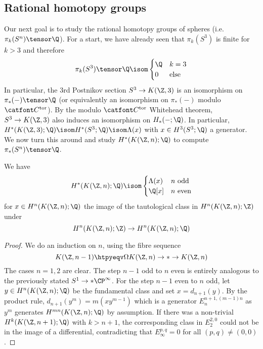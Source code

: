 \subsection{Rational homotopy groups}
Our next goal is to study the rational homotopy groups of spheres (i.e. $\pi_k(S^n) \tensor \Q$).
For a start, we have already seen that $\pi_k(S^3)$ is finite for $k > 3$ and therefore
\begin{equation*}\index{rational homotopy groups!of $S^3$}
	\pi_k(S^3) \tensor \Q \isom \begin{cases}
		\Q 	& k = 3 \\
		0 	& \text{else}
	\end{cases}
\end{equation*}
In particular, the 3rd Postnikov section $S^3 \to K(\Z, 3)$ is an isomorphism on $\pi_*({{-}}) \tensor \Q$ (or equivalently an isomorphism on $\pi_*({{-}})$ modulo $\Ctor$).
By the modulo $\Ctor$ Whitehead theorem, $S^3 \to K(\Z, 3)$ also induces an isomorphism on $H_*({{-}}; \Q)$.
In particular, $H^*(K(\Z, 3); \Q) \isom H^*(S^3; \Q) \isom \Lambda(x)$ with $x \in H^3(S^3; \Q)$ a generator.
We now turn this around and study $H^*(K(\Z, n); \Q)$ to compute $\pi_*(S^n) \tensor \Q$.
\begin{lemma}
	We have
	\begin{equation*}
		H^*(K(\Z, n); \Q) \isom \begin{cases}
			\Lambda(x) 	& n \text{ odd} \\
			\Q[x] 		& n \text{ even}
		\end{cases}
	\end{equation*}
	for $x \in H^n(K(\Z, n); \Q)$ the image of the tautological class in $H^n(K(\Z, n); \Z)$ under 
	\begin{equation*}
		H^n(K(\Z, n); \Z) \to H^n(K(\Z, n); \Q)
	\end{equation*}
\end{lemma}
\begin{proof}
	We do an induction on $n$, using the fibre sequence
	\begin{equation*}
		K(\Z, n - 1) \htpyeqv \Omega K(\Z, n) \to * \to K(\Z, n)
	\end{equation*}
	The cases $n = 1, 2$ are clear. 
	The step $n - 1$ odd to $n$ even is entirely analogous to the previously stated $S^1 \to * \CP^\infty$.
	For the step $n - 1$ even to $n$ odd, let $y \in H^n(K(\Z, n); \Q)$ be the fundamental class and set $x = d_{n + 1}(y)$.
	By the product rule, $d_{n + 1}(y^m) = m (x y^{m - 1})$ which is a generator $E_n^{n + 1, (m - 1) n}$ as $y^m$ generates $H^{m n}(K(\Z, n); \Q)$ by assumption.
	If there was a non-trivial $H^k(K(\Z, n + 1); \Q)$ with $k > n + 1$, the corresponding class in $E_2^{2, 0}$ could not be in the image of a differential, contradicting that $E_\infty^{p, q} = 0$ for all $(p, q) \neq (0, 0)$.
\end{proof}

